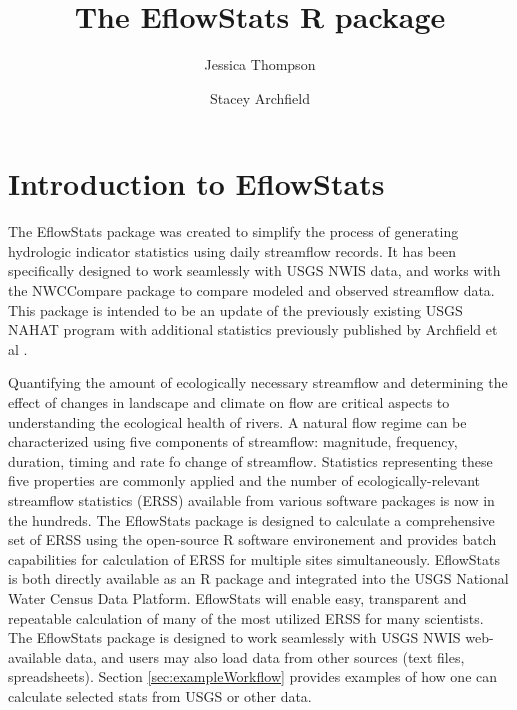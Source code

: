 \documentclass[a4paper,11pt]{article}\usepackage[]{graphicx}\usepackage[]{color}
\begin{document}
\title{The EflowStats R package}
\author[1]{Jessica Thompson}
\author[1]{Stacey Archfield}






\maketitle
\tableofcontents

\section{Introduction to EflowStats}
                
The EflowStats package was created to simplify the process of generating hydrologic indicator statistics using daily streamflow records. It has been specifically designed to work seamlessly with USGS NWIS data, and works with the NWCCompare package to compare modeled and observed streamflow data. This package is intended to be an update of the previously existing USGS NAHAT program \cite{NAHAT} with additional statistics previously published by Archfield et al \cite{Archfield}.     
              
Quantifying the amount of ecologically necessary streamflow and determining the effect of changes in landscape and climate on flow are critical aspects to understanding the ecological health of rivers. A natural flow regime can be characterized using five components of streamflow: magnitude, frequency, duration, timing and rate fo change of streamflow. Statistics representing these five properties are commonly applied and the number of ecologically-relevant streamflow statistics (ERSS) available from various software packages is now in the hundreds. The EflowStats package is designed to calculate a comprehensive set of ERSS using the open-source R software environement and provides batch capabilities for calculation of ERSS for multiple sites simultaneously. EflowStats is both directly available as an R package and integrated into the USGS National Water Census Data Platform. EflowStats will enable easy, transparent and repeatable calculation of many of the most utilized ERSS for many scientists. The EflowStats package is designed to work seamlessly with USGS NWIS web-available data, and users may also load data from other sources (text files, spreadsheets).  Section \ref{sec:exampleWorkflow} provides examples of how one can calculate selected stats from USGS or other data. 
              
\end{document}
